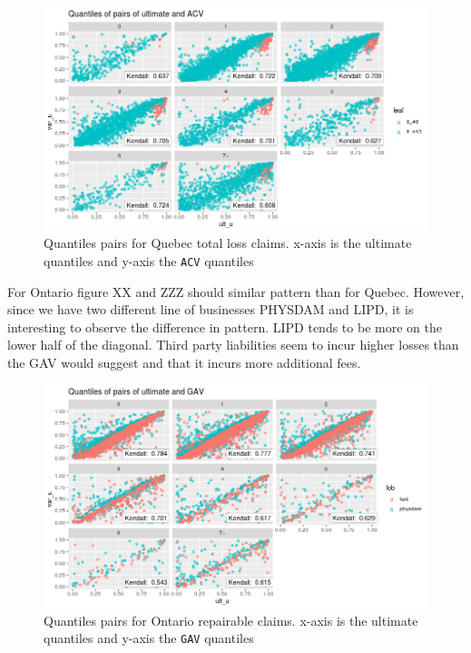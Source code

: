 	\begin{figure}[H]
		\begin{center}
			\includegraphics[scale=0.4]{Graphiques/qc_tl} 
			\renewcommand{\figurename}{Figure}
			\caption{Quantiles pairs for Quebec total loss claims. x-axis is the ultimate quantiles and y-axis the \texttt{ACV} quantiles}\label{Fig_copula_qc_tl}
		\end{center}
	\end{figure}

	For Ontario figure XX and ZZZ should similar pattern than for Quebec. However, since we have two different line of businesses PHYSDAM and LIPD, it is interesting to observe the difference in pattern. LIPD tends to be more on the lower half of the diagonal. Third party liabilities seem to incur higher losses than the GAV would suggest and that it incurs more additional fees. 
	
		\begin{figure}[H]
		\begin{center}
			\includegraphics[scale=0.4]{Graphiques/on_rep} 
			\renewcommand{\figurename}{Figure}
			\caption{Quantiles pairs for Ontario repairable claims. x-axis is the ultimate quantiles and y-axis the \texttt{GAV} quantiles}\label{Fig_copula_on_rep}
		\end{center}
	\end{figure}
	
